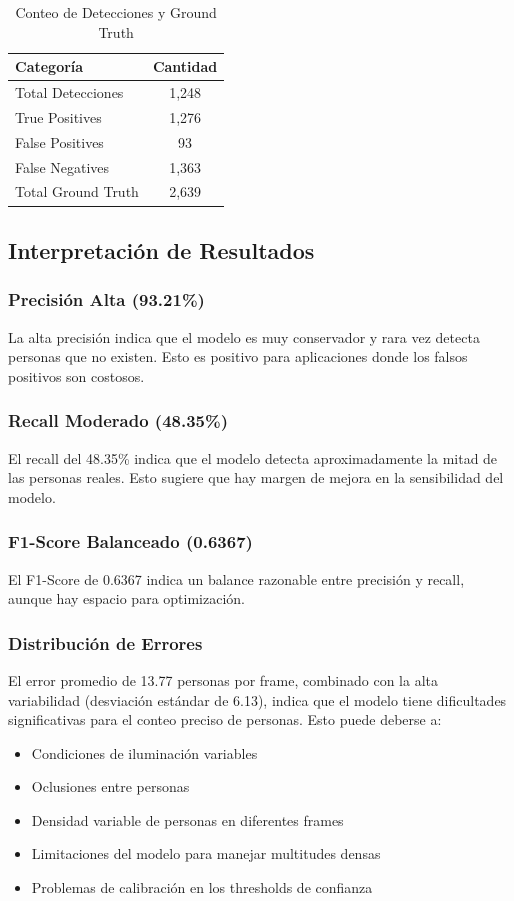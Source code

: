 \documentclass[12pt,a4paper]{article}
\begin{document}
\begin{table}[H]
\centering
\caption{Conteo de Detecciones y Ground Truth}
\begin{tabular}{@{}lc@{}}
\toprule
\textbf{Categoría} & \textbf{Cantidad} \\
\midrule
Total Detecciones & 1,248 \\
True Positives & 1,276 \\
False Positives & 93 \\
False Negatives & 1,363 \\
Total Ground Truth & 2,639 \\
\bottomrule
\end{tabular}
\end{table}

\subsection{Interpretación de Resultados}

\subsubsection{Precisión Alta (93.21\%)}
La alta precisión indica que el modelo es muy conservador y rara vez detecta personas que no existen. Esto es positivo para aplicaciones donde los falsos positivos son costosos.

\subsubsection{Recall Moderado (48.35\%)}
El recall del 48.35\% indica que el modelo detecta aproximadamente la mitad de las personas reales. Esto sugiere que hay margen de mejora en la sensibilidad del modelo.

\subsubsection{F1-Score Balanceado (0.6367)}
El F1-Score de 0.6367 indica un balance razonable entre precisión y recall, aunque hay espacio para optimización.

\subsubsection{Distribución de Errores}
El error promedio de 13.77 personas por frame, combinado con la alta variabilidad (desviación estándar de 6.13), indica que el modelo tiene dificultades significativas para el conteo preciso de personas. Esto puede deberse a:
\begin{itemize}
    \item Condiciones de iluminación variables
    \item Oclusiones entre personas
    \item Densidad variable de personas en diferentes frames
    \item Limitaciones del modelo para manejar multitudes densas
    \item Problemas de calibración en los thresholds de confianza
\end{itemize}
\end{document}
